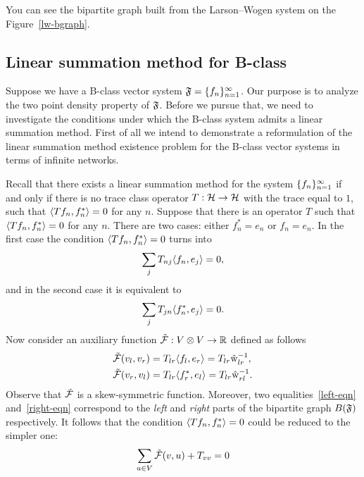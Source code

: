 \documentclass[12pt]{amsart}
\begin{document}
    You can see the bipartite graph built from the Larson--Wogen system on the Figure~\ref{lw-bgraph}.

    \subsection{Linear summation method for B-class}
    Suppose we have a B-class vector system $\fsys=\seq{f}$.
    Our purpose is to analyze the two point density property of $\fsys$.
    Before we pursue that, we need to investigate the conditions under which the B-class system admits a linear summation method.
    First of all we intend to demonstrate a reformulation of the linear summation method existence problem for
      the B-class vector systems in terms of infinite networks.

    Recall that there exists a linear summation method for the system $\seq{f}$
      if and only if there is no trace class operator $T: \cal{H} \to \cal{H}$ with the trace equal to $1$,
      such that $\inner{Tf_n}{f_n^*} = 0$ for any $n$.
    Suppose that there is an operator $T$ such that $\inner{Tf_n}{f_n^*} = 0$ for any $n$.
    There are two cases: either $f^*_n = e_n$ or $f_n = e_n$.
    In the first case the condition $\inner{Tf_n}{f_n^*} = 0$ turns into
    \begin{equation}
        \label{left-eqn}
        \sum_j T_{nj} \inner{f_n}{e_j} = 0,
    \end{equation}
    and in the second case it is equivalent to
    \begin{equation}
        \label{right-eqn}
        \sum_j T_{jn} \inner{f^*_n}{e_j} = 0.
    \end{equation}
    Now consider an auxiliary function $\flowsgn: V \otimes V \to \mathbb{R}$ defined as follows
    \begin{align*}
        &\flowsgn(v_l, v_r) = T_{lr} \inner{f_l}{e_r} = T_{lr} \wt_{lr}^{-1},\\
        &\flowsgn(v_r, v_l) = T_{lr} \inner{f^*_r}{e_l} = T_{lr} \wt_{rl}^{-1}.
    \end{align*}
    Observe that $\flowsgn$ is a skew-symmetric function.
    Moreover, two equalities~\eqref{left-eqn} and~\eqref{right-eqn} correspond to the \emph{left} and \emph{right}
      parts of the bipartite graph $B(\fsys)$ respectively.
    It follows that the condition $\inner{Tf_n}{f_n^*} = 0$ could be reduced to the simpler one:
    \begin{equation}
      \label{almost-flow-eqn}
      \sum_{u \in V} \flowsgn(v, u) + T_{vv} = 0
    \end{equation}
\end{document}
